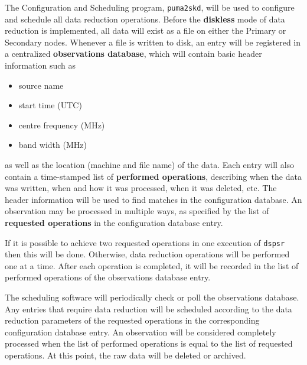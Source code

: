 The Configuration and Scheduling program, {\tt puma2skd}, will be used
to configure and schedule all data reduction operations.  Before the
{\bf diskless} mode of data reduction is implemented, all data will
exist as a file on either the Primary or Secondary nodes.  Whenever a
file is written to disk, an entry will be registered in a centralized
{\bf observations database}, which will contain basic header
information such as
\begin{itemize}
\item source name

\item start time (UTC)

\item centre frequency (MHz)

\item band width (MHz)
\end{itemize}
as well as the location (machine and file name) of the data.  Each
entry will also contain a time-stamped list of {\bf performed
operations}, describing when the data was written, when and how it was
processed, when it was deleted, etc.  The header information will be
used to find matches in the configuration database.  An observation
may be processed in multiple ways, as specified by the list of {\bf
requested operations} in the configuration database entry.

If it is possible to achieve two requested operations in one execution
of {\tt dspsr} then this will be done.  Otherwise, data reduction
operations will be performed one at a time.  After each operation is
completed, it will be recorded in the list of performed operations of
the observations database entry.

The scheduling software will periodically check or poll the
observations database.  Any entries that require data reduction will
be scheduled according to the data reduction parameters of the
requested operations in the corresponding configuration database
entry.  An observation will be considered completely processed when
the list of performed operations is equal to the list of requested
operations.  At this point, the raw data will be deleted or archived.
